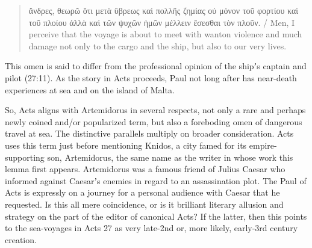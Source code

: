 \vspace*{3mm} 
 \begin{quote}ἄνδρες, θεωρῶ ὅτι μετὰ ὕβρεως καὶ πολλῆς ζημίας οὐ μόνον %
    τοῦ φορτίου καὶ τοῦ πλοίου ἀλλὰ καὶ τῶν ψυχῶν ἡμῶν μέλλειν ἔσεσθαι τὸν πλοῦν. / %
 Men, I perceive that the voyage is about to meet with wanton violence and much damage %
 not only to the cargo and the ship, %
 but also to our very lives.\end{quote} %
\vspace*{3mm}

\noindent{}This omen is said to differ from the professional opinion of the shipʼs captain and pilot (27:11). 
As the story in Acts proceeds, Paul not long after has near-death experiences at sea and on the island of Malta. %

So, Acts aligns with Artemidorus in several respects, %
not only a rare and perhaps newly coined and/or popularized term, %
but also a foreboding omen of dangerous travel at sea. %
The distinctive parallels multiply on broader consideration. %
Acts uses this term just before mentioning Knidos, %
a city famed for its empire-supporting son, Artemidorus, %
the same name as the writer in whose work this lemma first appears. %
Artemidorus was a famous friend of Julius Caesar who informed %
against Caesarʼs enemies in regard to an assassination plot. %
The Paul of Acts is expressly on a journey for a personal audience with Caesar that he requested. %
Is this all mere coincidence, or is it brilliant literary allusion and strategy %
on the part of the editor of canonical Acts? %
If the latter, then this points to the sea-voyages in Acts 27 as very late-2nd or, more likely, early-3rd century creation. %
%

